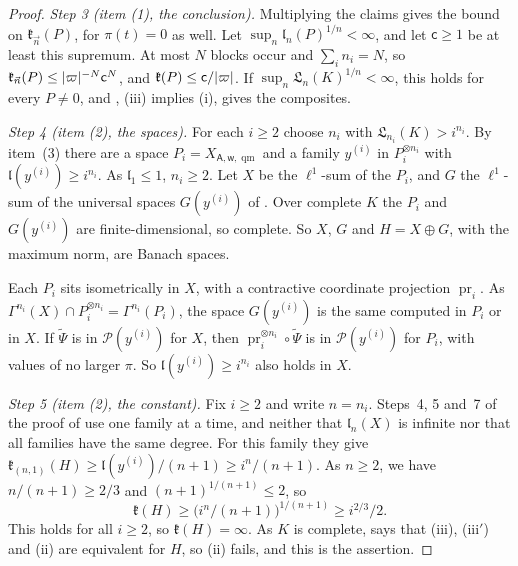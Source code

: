 \begin{proof}
\emph{Step 3 (item (1), the conclusion).} Multiplying the claims gives the bound on $\mathfrak k_{\vec n}(P)$, for $\pi(t)=0$ as well. Let $\sup_n\mathfrak l_n(P)^{1/n}<\infty$, and let $\mathsf c\ge1$ be at least this supremum. At most $N$ blocks occur and $\sum_in_i=N$, so $\mathfrak k_{\vec n}(P)\le\lvert \varpi\rvert^{-N}\mathsf c^N$, and $\mathfrak k(P)\le\mathsf c/\lvert \varpi\rvert$. If $\sup_n\mathfrak L_n(K)^{1/n}<\infty$, this holds for every $P\ne0$, and \cite[Theorem~14.22]{I}, (iii) implies (i), gives the composites.

\emph{Step 4 (item (2), the spaces).} For each $i\ge2$ choose $n_i$ with $\mathfrak L_{n_i}(K)>i^{n_i}$. By item~(3) there are a space $P_i=X_{\mathsf A,\mathsf w,\operatorname{qm}}$ and a family $y^{(i)}$ in $P_i^{\otimes n_i}$ with $\mathfrak l(y^{(i)})\ge i^{n_i}$. As $\mathfrak l_1\le1$, $n_i\ge2$. Let $X$ be the $\ell^1$-sum of the $P_i$, and $G$ the $\ell^1$-sum of the universal spaces $G(y^{(i)})$ of \cite[Definition~14.15]{I}. Over complete $K$ the $P_i$ and $G(y^{(i)})$ are finite-dimensional, so complete. So $X$, $G$ and $H=X\oplus G$, with the maximum norm, are Banach spaces.

Each $P_i$ sits isometrically in $X$, with a contractive coordinate projection $\operatorname{pr}_i$. As $\Gamma^{n_i}(X)\cap P_i^{\otimes n_i}=\Gamma^{n_i}(P_i)$, the space $G(y^{(i)})$ is the same computed in $P_i$ or in $X$. If $\tilde\Psi$ is in $\mathcal P(y^{(i)})$ for $X$, then $\operatorname{pr}_i^{\otimes n_i}\circ\tilde\Psi$ is in $\mathcal P(y^{(i)})$ for $P_i$, with values of no larger $\pi$. So $\mathfrak l(y^{(i)})\ge i^{n_i}$ also holds in $X$.

\emph{Step 5 (item (2), the constant).} Fix $i\ge2$ and write $n=n_i$. Steps~4, 5 and~7 of the proof of \cite[Proposition~14.18]{I} use one family at a time, and neither that $\mathfrak l_n(X)$ is infinite nor that all families have the same degree. For this family they give $\mathfrak k_{(n,1)}(H)\ge\mathfrak l(y^{(i)})/(n+1)\ge i^n/(n+1)$. As $n\ge2$, we have $n/(n+1)\ge2/3$ and $(n+1)^{1/(n+1)}\le2$, so
\[
 \mathfrak k(H)\ge\bigl(i^n/(n+1)\bigr)^{1/(n+1)}\ge i^{2/3}/2.
\]
This holds for all $i\ge2$, so $\mathfrak k(H)=\infty$. As $K$ is complete, \cite[Theorem~14.22]{I} says that \textup{(iii)}, \textup{(iii$'$)} and \textup{(ii)} are equivalent for $H$, so \textup{(ii)} fails, and this is the assertion.
\end{proof}
